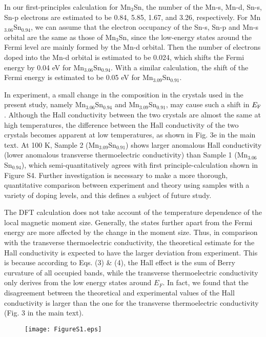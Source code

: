 \documentclass[amsmath,amssymb]{nature}
\begin{document}
	In our first-principles calculation for Mn$_{3}$Sn, the number of the Mn-s, Mn-d, Sn-s, Sn-p electrons are estimated to be 0.84, 5.85, 1.67, and 3.26, respectively.
	For Mn$_{3.06}$Sn$_{0.94}$, we can assume that the electron occupancy of the Sn-s,
	Sn-p and Mn-s orbital
	are the same as those of Mn$_{3}$Sn, since the low-energy states around the
	Fermi level are mainly formed
	by the Mn-d orbital. Then the number of electrons doped into the Mn-d
	orbital is estimated to be 0.024,
	which shifts the Fermi energy by 0.04 eV for Mn$_{3.06}$Sn$_{0.94}$. With a similar calculation, the
	shift of the Fermi energy
	is estimated to be 0.05 eV for Mn$_{3.09}$Sn$_{0.91}$.
	
	In experiment, a small change in the composition in the crystals used in the present study, namely Mn$_{3.06}$Sn$_{0.94}$ and  Mn$_{3.09}$Sn$_{0.91}$, may cause such a shift in $E_{\rm F}$. Although the Hall conductivity between the two crystals are almost the same at high temperatures,  the difference between the Hall conductivity of the two crystals becomes apparent at low temperatures, as shown in Fig. 3e in the main text. At 100 K,  Sample 2 (Mn$_{3.09}$Sn$_{0.91}$) shows larger anomalous Hall conductivity (lower anomalous transverse thermoelectric conductivity) than Sample 1  (Mn$_{3.06}$Sn$_{0.94}$), which semi-quantitatively agrees with first principle-calculation shown in Figure S4. Further investigation is necessary to make a more thorough, quantitative comparison between experiment and theory using samples with a variety of doping levels, and this defines a subject of future study.
	
	
	The DFT calculation does not take account of the temperature dependence of the local magnetic moment size. Generally, the states further apart from the Fermi energy are more affected by the change in the moment size. Thus, in comparison with the transverse thermoelectric conductivity, the theoretical estimate for the Hall conductivity is expected to have the larger deviation from experiment. This is because according to Eqs. (3) \& (4), the Hall effect is the sum of Berry curvature of all occupied bands, while the transverse thermoelectric conductivity only derives from the low energy states around $E_{F}$. In fact, we found that the disagreement between the theoretical and experimental values of the Hall conductivity is larger than the one for the transverse thermoelectric conductivity (Fig. 3 in the main text). 
	
	
	\color{black}

\begin{figure}
	\begin{center}
		\hspace{-1cm}
		\texttt{[image: FigureS1.eps]}
	\end{center}
\end{figure}
\end{document}
